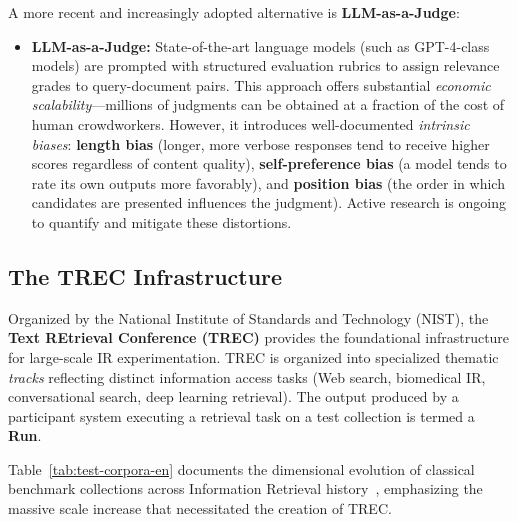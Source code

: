 A more recent and increasingly adopted alternative is \textbf{LLM-as-a-Judge}:
\begin{itemize}
    \item \textbf{LLM-as-a-Judge:} State-of-the-art language models (such as GPT-4-class models) are prompted with structured evaluation rubrics to assign relevance grades to query-document pairs. This approach offers substantial \emph{economic scalability}—millions of judgments can be obtained at a fraction of the cost of human crowdworkers. However, it introduces well-documented \emph{intrinsic biases}: \textbf{length bias} (longer, more verbose responses tend to receive higher scores regardless of content quality), \textbf{self-preference bias} (a model tends to rate its own outputs more favorably), and \textbf{position bias} (the order in which candidates are presented influences the judgment). Active research is ongoing to quantify and mitigate these distortions.
\end{itemize}

\subsection{The TREC Infrastructure}
Organized by the National Institute of Standards and Technology (NIST), the \textbf{Text REtrieval Conference (TREC)} provides the foundational infrastructure for large-scale IR experimentation.
TREC is organized into specialized thematic \textit{tracks} reflecting distinct information access tasks (Web search, biomedical IR, conversational search, deep learning retrieval).
The output produced by a participant system executing a retrieval task on a test collection is termed a \textbf{Run}.

Table~\ref{tab:test-corpora-en} documents the dimensional evolution of classical benchmark collections across Information Retrieval history~\cite{manning2008}, emphasizing the massive scale increase that necessitated the creation of TREC.

